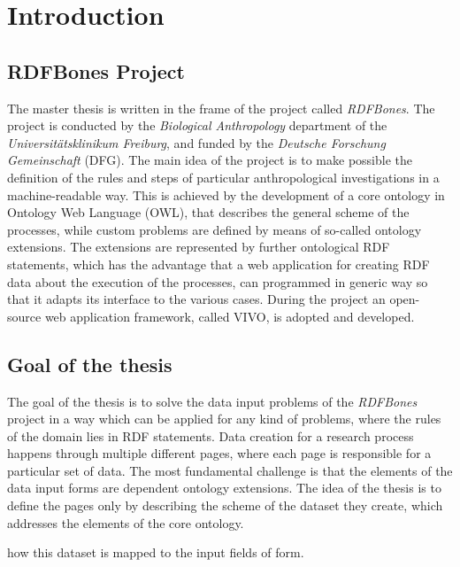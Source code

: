\chapter{Introduction}


\section{RDFBones Project}

The master thesis is written in the frame of the project called \textit{RDFBones}. The project is conducted by the \textit{Biological Anthropology} department of the \textit{Universitätsklinikum Freiburg}, and funded by the \textit{Deutsche Forschung Gemeinschaft} (DFG). The main idea of the project is to make possible the definition of the rules and steps of particular anthropological investigations in a machine-readable way. This is achieved by the development of a core ontology in Ontology Web Language (OWL), that describes the general scheme of the processes, while custom problems are defined by means of so-called ontology extensions. The extensions are represented by further ontological RDF statements, which has the advantage that a web application for creating RDF data about the execution of the processes, can programmed in generic way so that it adapts its interface to the various cases. During the project an open-source web application framework, called VIVO, is adopted and developed.

\section{Goal of the thesis}

The goal of the thesis is to solve the data input problems of the \textit{RDFBones} project in a way which can be applied for any kind of problems, where the rules of the domain lies in RDF statements. Data creation for a research process happens through multiple different pages, where each page is responsible for a particular set of data. The most fundamental challenge is that the elements of the data input forms are dependent ontology extensions. The idea of the thesis is to define the pages only by describing the scheme of the dataset they create, which addresses the elements of the core ontology. 


how this dataset is mapped to the input fields of form. 






